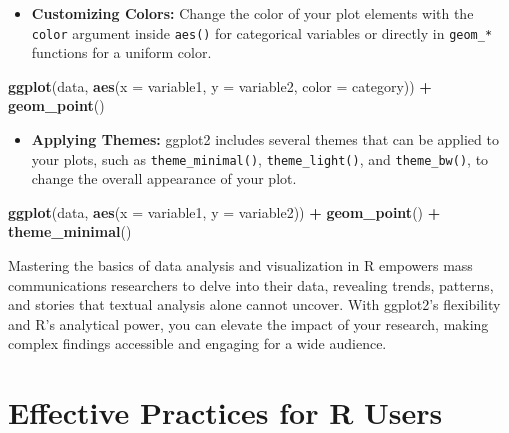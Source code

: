 \documentclass[
]{book}
\newenvironment{Shaded}{\begin{snugshade}}{\end{snugshade}}
\newcommand{\AttributeTok}[1]{\textcolor[rgb]{0.13,0.29,0.53}{#1}}
\newcommand{\FunctionTok}[1]{\textcolor[rgb]{0.13,0.29,0.53}{\textbf{#1}}}
\newcommand{\NormalTok}[1]{#1}
\newcommand{\SpecialCharTok}[1]{\textcolor[rgb]{0.81,0.36,0.00}{\textbf{#1}}}
\providecommand{\tightlist}{%
  \setlength{\itemsep}{0pt}\setlength{\parskip}{0pt}}
\begin{document}
\begin{itemize}
\tightlist
\item
  \textbf{Customizing Colors:} Change the color of your plot elements with the \texttt{color} argument inside \texttt{aes()} for categorical variables or directly in \texttt{geom\_*} functions for a uniform color.
\end{itemize}

\begin{Shaded}
\begin{Highlighting}[]
\FunctionTok{ggplot}\NormalTok{(data, }\FunctionTok{aes}\NormalTok{(}\AttributeTok{x =}\NormalTok{ variable1, }\AttributeTok{y =}\NormalTok{ variable2, }\AttributeTok{color =}\NormalTok{ category)) }\SpecialCharTok{+} 
  \FunctionTok{geom\_point}\NormalTok{()}
\end{Highlighting}
\end{Shaded}

\begin{itemize}
\tightlist
\item
  \textbf{Applying Themes:} ggplot2 includes several themes that can be applied to your plots, such as \texttt{theme\_minimal()}, \texttt{theme\_light()}, and \texttt{theme\_bw()}, to change the overall appearance of your plot.
\end{itemize}

\begin{Shaded}
\begin{Highlighting}[]
\FunctionTok{ggplot}\NormalTok{(data, }\FunctionTok{aes}\NormalTok{(}\AttributeTok{x =}\NormalTok{ variable1, }\AttributeTok{y =}\NormalTok{ variable2)) }\SpecialCharTok{+} 
  \FunctionTok{geom\_point}\NormalTok{() }\SpecialCharTok{+}
  \FunctionTok{theme\_minimal}\NormalTok{()}
\end{Highlighting}
\end{Shaded}

Mastering the basics of data analysis and visualization in R empowers mass communications researchers to delve into their data, revealing trends, patterns, and stories that textual analysis alone cannot uncover. With ggplot2's flexibility and R's analytical power, you can elevate the impact of your research, making complex findings accessible and engaging for a wide audience.

\hypertarget{effective-practices-for-r-users}{%
\section{Effective Practices for R Users}\label{effective-practices-for-r-users}}
\end{document}
